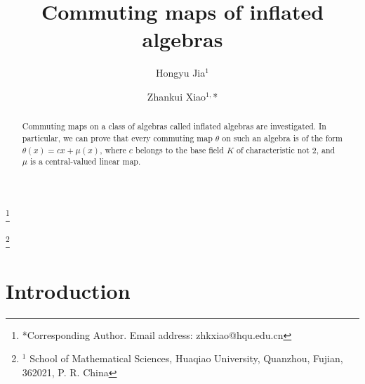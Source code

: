 \documentclass[reqno]{amsart}
\theoremstyle{plain}
\theoremstyle{definition}
\begin{document}
\title[Commuting maps of inflated algebras]
{Commuting maps of inflated algebras}

%
%
%
%
%
%



\author{Hongyu Jia$^{1}$}
\address{Jia: School of Mathematical Sciences, Huaqiao University,
Quanzhou, Fujian, 362021, P. R. China}



\author{Zhankui Xiao$^{1,}$* }
\thanks{*Corresponding Author. Email address: zhkxiao@hqu.edu.cn}
\address{Xiao: School of Mathematical Sciences, Huaqiao University,
Quanzhou, Fujian, 362021, P. R. China}

\thanks{$^{1}$ School of Mathematical Sciences, Huaqiao University,
Quanzhou, Fujian, 362021, P. R. China}

\begin{abstract}
Commuting maps on a class of algebras called inflated
algebras are investigated. 
In particular, we can prove that  every
commuting map $\theta$ on such an algebra is of the form
$\theta(x)=c x+\mu(x)$, where $c$ belongs to the base
field $K$ of characteristic not 2, and $\mu$ is a central-valued linear map.
\end{abstract}





\maketitle

\section{Introduction}\label{xxsec1}
\end{document}

